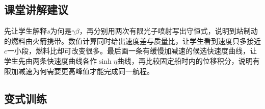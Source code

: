 \documentclass[UTF8,fontset=fandol,a4paper,11pt]{ctexart}
\begin{document}


\subsection*{课堂讲解建议}

先让学生解释$s$为何是$\gamma\beta$，再分别用两次有限光子喷射写出守恒式，说明到站制动的燃料由火箭携带。数值计算同时给出速度差与质量比，让学生看到速度只多接近$c$一小段，燃料比却可改变很多。最后画一条有缓慢加减速的候选快速度曲线，让学生先由两条快速度曲线各作$\sinh\eta$曲线，再比较固定船时内的位移积分，说明有限加减速为何需要更高峰值才能完成同一航程。



\subsection*{变式训练}
\end{document}
